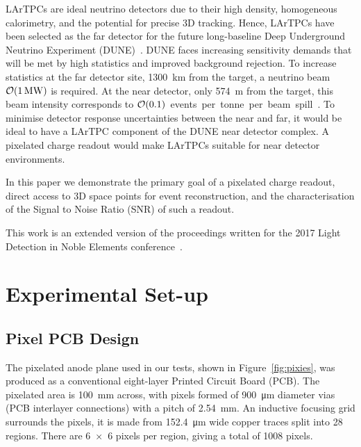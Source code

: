 \documentclass[instruments,article,submit,moreauthors,pdftex]{Definitions/mdpi}
\begin{document}
LArTPCs are ideal neutrino detectors due to their high density, homogeneous calorimetry, and the potential for precise 3D tracking.
Hence, LArTPCs have been selected as the far detector for the future long-baseline Deep Underground Neutrino Experiment (DUNE)~\cite{DUNE}.  
DUNE faces increasing sensitivity demands that will be met by high statistics and improved background rejection. 
To increase statistics at the far detector site, \SI{1300}{\kilo\metre} from the target, a neutrino beam $\order{\SI{1}{\mega\watt}}$ is required.
At the near detector, only \SI{574}{\metre} from the target, this beam intensity corresponds to $\order{0.1}$~events~per~tonne~per~beam~spill~\cite{DUNE2,DUNE3}.
To minimise detector response uncertainties between the near and far, it would be ideal to have a LArTPC component of the DUNE near detector complex.
A pixelated charge readout would make LArTPCs suitable for near detector environments.

In this paper we demonstrate the primary goal of a pixelated charge readout, direct access to 3D space points for event reconstruction, and the characterisation of the Signal to Noise Ratio (SNR) of such a readout. 

This work is an extended version of the proceedings written for the 2017 Light Detection in Noble Elements conference~\cite{ldine}.  

\section{Experimental Set-up}

\subsection{Pixel PCB Design} \label{sec:PCB}

The pixelated anode plane used in our tests, shown in Figure~\ref{fig:pixies}, was produced as a conventional eight-layer Printed Circuit Board (PCB). 
The pixelated area is \SI{100}{\milli\metre} across, with pixels formed of \SI{900}{\micro\metre} diameter vias (PCB interlayer connections) with a pitch of \SI{2.54}{\milli\metre}.
An inductive focusing grid surrounds the pixels, it is made from \SI{152.4}{\micro\metre} wide copper traces split into 28 regions.
There are \num{6 x 6} pixels per region, giving a total of 1008 pixels. 
\end{document}
